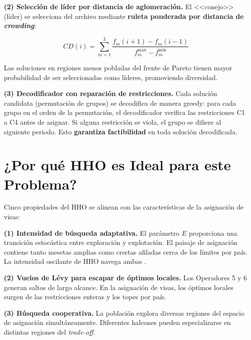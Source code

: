 \documentclass[12pt,letterpaper]{article}
\begin{document}
\textbf{(2) Selección de líder por distancia de aglomeración.} El <<conejo>> (líder) se selecciona del archivo mediante \textbf{ruleta ponderada por distancia de \textit{crowding}}:

\begin{formulabox}
\begin{equation}
CD(i) = \sum_{m=1}^{3} \frac{f_m(i+1) - f_m(i-1)}{f_m^{\max} - f_m^{\min}}
\label{eq:crowding}
\end{equation}
\end{formulabox}

Las soluciones en regiones menos pobladas del frente de Pareto tienen mayor probabilidad de ser seleccionadas como líderes, promoviendo diversidad.

\textbf{(3) Decodificador con reparación de restricciones.} Cada solución candidata (permutación de grupos) se decodifica de manera greedy: para cada grupo en el orden de la permutación, el decodificador verifica las restricciones C1 a C4 antes de asignar. Si alguna restricción se viola, el grupo se difiere al siguiente periodo. Esto \textbf{garantiza factibilidad} en toda solución decodificada.

\section{¿Por qué HHO es Ideal para este Problema?}

Cinco propiedades del HHO se alinean con las características de la asignación de visas:

\textbf{(1) Intensidad de búsqueda adaptativa.} El parámetro $E$ proporciona una transición estocástica entre exploración y explotación. El paisaje de asignación contiene tanto mesetas amplias como crestas afiladas cerca de los límites por país. La intensidad oscilante de HHO navega ambas \parencite{heidari2019}.

\textbf{(2) Vuelos de Lévy para escapar de óptimos locales.} Los Operadores 5 y 6 generan saltos de largo alcance. En la asignación de visas, los óptimos locales surgen de las restricciones enteras y los topes por país.

\textbf{(3) Búsqueda cooperativa.} La población explora diversas regiones del espacio de asignación simultáneamente. Diferentes halcones pueden especializarse en distintas regiones del \textit{trade-off}.
\end{document}
